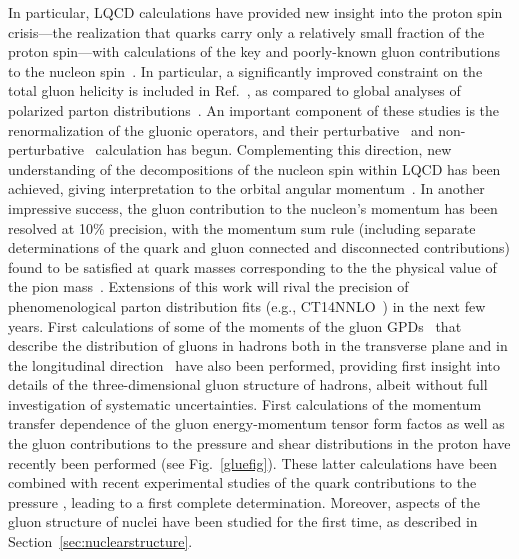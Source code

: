 In particular, LQCD calculations have provided new insight into the proton spin crisis---the realization that quarks carry only a relatively small fraction of the proton spin---with calculations of the key and poorly-known gluon contributions to the nucleon spin~\cite{Alexandrou:2017oeh,Yang:2016plb}. In particular, a significantly improved constraint on the total gluon helicity is included in Ref.~\cite{Yang:2016plb}, as compared to global analyses of polarized parton distributions~\cite{deFlorian:2014yva}. An important component of these studies is the renormalization of the gluonic operators, and their perturbative~\cite{Glatzmaier:2014sya,Alexandrou:2017oeh} and non-perturbative~\cite{paper by Yibo et al to appear next week} calculation has begun. Complementing this direction, new understanding of the decompositions of the nucleon spin within LQCD has been achieved, giving interpretation to the   orbital angular momentum~\cite{Engelhardt:2017miy}. 
%
In another impressive success, the gluon contribution to the nucleon's momentum has been resolved at 10\% precision, with the momentum sum rule (including separate determinations of the quark and gluon connected and disconnected contributions) found to be satisfied at quark masses corresponding to the the physical value of the pion mass~\cite{Alexandrou:2017oeh}. Extensions of this work will rival the precision of phenomenological parton distribution fits (e.g., CT14NNLO~\cite{Dulat:2015mca}) in the next few years.
%
First calculations of some of the moments of the gluon GPDs~\cite{Diehl:2003ny} that describe the distribution of gluons in hadrons both in the transverse plane and in the longitudinal direction~\cite{Detmold:2016gpy,Detmold:2017oqb} have also been performed, providing first insight into details of the three-dimensional gluon structure of hadrons, albeit without full investigation of systematic uncertainties. 
First calculations of the momentum transfer dependence of the gluon energy-momentum tensor form factos as well as the gluon contributions to the pressure and shear distributions in the proton have recently been performed \cite{Shanahan:2018nnv,Shanahan:2018pib} (see Fig.~\ref{gluefig}). These latter calculations have been combined with recent experimental studies of the quark contributions to the pressure \cite{Burkert:2018bqq}, leading to a first complete determination.
Moreover, aspects of the gluon structure of nuclei have been studied for the first time,  as described in Section~\ref{sec:nuclearstructure}.

